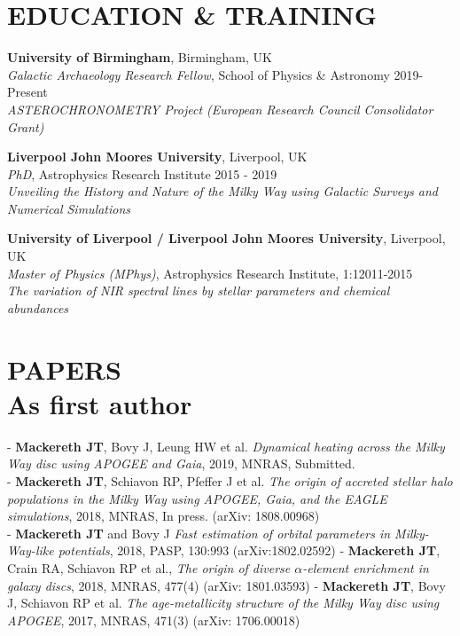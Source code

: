 \documentclass[margin]{res}
\begin{document}
\begin{resume}


\section{EDUCATION \& TRAINING}
\textbf{University of Birmingham}, Birmingham, UK\\
{\sl Galactic Archaeology Research Fellow}, School of Physics \& Astronomy \hfill 2019-Present\\
\emph{ASTEROCHRONOMETRY Project (European Research Council Consolidator Grant)}

\textbf{Liverpool John Moores University}, Liverpool, UK\\
{\sl PhD}, Astrophysics Research Institute \hfill 2015 - 2019\\
\emph{Unveiling the History and Nature of the Milky Way using Galactic Surveys and Numerical Simulations}

\textbf{University of Liverpool / Liverpool John Moores University}, Liverpool, UK\\
{\sl Master of Physics (MPhys)}, Astrophysics Research Institute, 1:1\hfill 2011-2015
\\
\emph{The variation of NIR spectral lines by stellar parameters and chemical abundances}


\section{PAPERS\\ As first author}
\par
- \textbf{Mackereth JT}, Bovy J, Leung HW et al. \emph{Dynamical heating across the Milky Way disc using APOGEE and Gaia}, 2019, MNRAS, Submitted. \\
- \textbf{Mackereth JT}, Schiavon RP, Pfeffer J et al. \emph{The origin of accreted stellar halo populations in the Milky Way using APOGEE, Gaia, and the EAGLE simulations}, 2018, MNRAS, In press. (arXiv: 1808.00968) \\
- \textbf{Mackereth JT} and Bovy J \emph{Fast estimation of orbital parameters in Milky-Way-like potentials}, 2018, PASP, 130:993 (arXiv:1802.02592)
\newline - \textbf{Mackereth JT}, Crain RA, Schiavon RP et al., \emph{The origin of diverse $\alpha$-element enrichment in galaxy discs}, 2018, MNRAS, 477(4) (arXiv: 1801.03593) 
\newline - \textbf{Mackereth JT}, Bovy J, Schiavon RP et al. \emph{The age-metallicity structure of the Milky Way disc using APOGEE}, 2017, MNRAS, 471(3) (arXiv: 1706.00018)


\end{resume}
\end{document}
